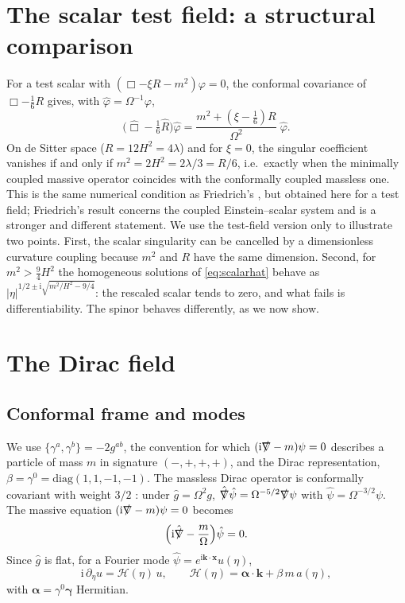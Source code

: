 \documentclass[11pt,a4paper]{article}
\theoremstyle{definition}
\newcommand{\ii}{\mathrm{i}}
\newcommand{\hg}{\hat g}
\newcommand{\hpsi}{\hat\psi}
\newcommand{\hphi}{\hat\varphi}
\begin{document}
\section{The scalar test field: a structural comparison}
\label{sec:scalar}

For a test scalar with $(\Box-\xi R-m^{2})\varphi=0$, the conformal covariance of $\Box-\tfrac16R$ gives, with $\hphi=\Omega^{-1}\varphi$,
\begin{equation}
\Big(\hat\Box-\tfrac16\hat R\Big)\hphi=\frac{m^{2}+(\xi-\tfrac16)R}{\Omega^{2}}\;\hphi .
\label{eq:scalarhat}
\end{equation}
On de Sitter space ($R=12H^{2}=4\lambda$) and for $\xi=0$, the singular coefficient vanishes if and only if $m^{2}=2H^{2}=2\lambda/3=R/6$, i.e.\ exactly when the minimally coupled massive operator coincides with the conformally coupled massless one. This is the same numerical condition as Friedrich's \cite{Friedrich2015}, but obtained here for a test field; Friedrich's result concerns the coupled Einstein--scalar system and is a stronger and different statement. We use the test-field version only to illustrate two points. First, the scalar singularity can be cancelled by a dimensionless curvature coupling because $m^{2}$ and $R$ have the same dimension. Second, for $m^{2}>\tfrac94H^{2}$ the homogeneous solutions of \eqref{eq:scalarhat} behave as $|\eta|^{1/2\pm\ii\sqrt{m^{2}/H^{2}-9/4}}$: the rescaled scalar tends to zero, and what fails is differentiability. The spinor behaves differently, as we now show.

\section{The Dirac field}
\label{sec:dirac}

\subsection{Conformal frame and modes}
\label{sec:modes}

We use $\{\gamma^{a},\gamma^{b}\}=-2g^{ab}$, the convention for which $(\ii\slashed\nabla-m)\psi=0$ describes a particle of mass $m$ in signature $(-,+,+,+)$, and the Dirac representation, $\beta=\gamma^{0}=\mathrm{diag}(1,1,-1,-1)$. The massless Dirac operator is conformally covariant with weight $3/2$ \cite{BirrellDavies,ParkerToms}: under $\hg=\Omega^{2}g$, $\hat{\slashed\nabla}\hpsi=\Omega^{-5/2}\slashed\nabla\psi$ with $\hpsi=\Omega^{-3/2}\psi$. The massive equation $(\ii\slashed\nabla-m)\psi=0$ becomes
\begin{equation}
\Big(\ii\hat{\slashed\nabla}-\frac{m}{\Omega}\Big)\hpsi=0 .
\label{eq:dirachat}
\end{equation}
Since $\hg$ is flat, for a Fourier mode $\hpsi=e^{\ii\mathbf{k}\cdot\mathbf{x}}u(\eta)$,
\begin{equation}
\ii\,\partial_{\eta}u=\mathcal{H}(\eta)\,u,\qquad \mathcal{H}(\eta)=\boldsymbol\alpha\cdot\mathbf{k}+\beta\,m\,a(\eta),
\label{eq:hk}
\end{equation}
with $\boldsymbol\alpha=\gamma^{0}\boldsymbol\gamma$ Hermitian.
\end{document}

